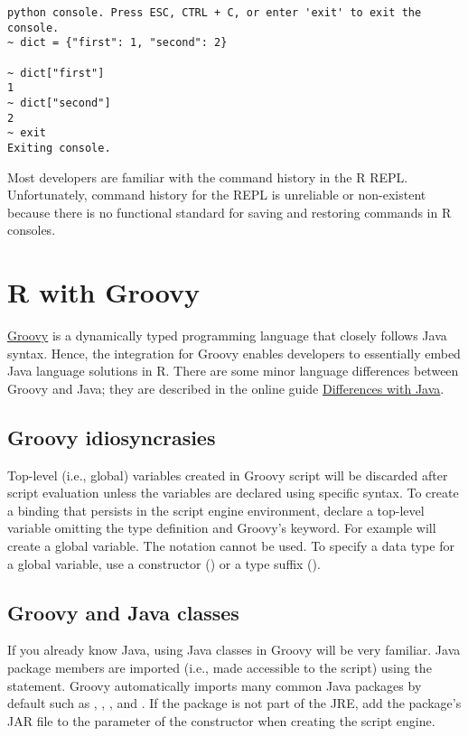 \begin{verbatim}
python console. Press ESC, CTRL + C, or enter 'exit' to exit the console.
~ dict = {"first": 1, "second": 2}

~ dict["first"]
1
~ dict["second"]
2
~ exit
Exiting console.
\end{verbatim}

Most developers are familiar with the command history in the R REPL.  Unfortunately, command history for the  REPL is unreliable or non-existent because there is no functional standard for saving and restoring commands in R consoles.

\section{R with Groovy}

\href{http://www.groovy-lang.org/}{Groovy} is a dynamically typed programming language that closely follows Java syntax. Hence, the  integration for Groovy enables developers to essentially embed Java language solutions in R. There are some minor language differences between Groovy and Java; they are described in the online guide  \href{http://groovy-lang.org/differences.html}{Differences with Java}. %

\subsection{Groovy idiosyncrasies}

Top-level (i.e., global) variables created in Groovy script will be discarded after script evaluation unless the variables are declared using specific syntax. To create a binding that persists in the script engine environment, declare a top-level variable omitting the type definition and Groovy's  keyword. For example  will create a global variable. The  notation cannot be used. To specify a data type for a global variable, use a constructor () or a type suffix ().

\subsection{Groovy and Java classes}

If you already know Java, using Java classes in Groovy will be very familiar. Java package members are imported (i.e., made accessible to the script) using the  statement. Groovy automatically imports many common Java packages by default such as , , , and . If the package is not part of the JRE, add the package's JAR file to the  parameter of the  constructor when creating the script engine. 

